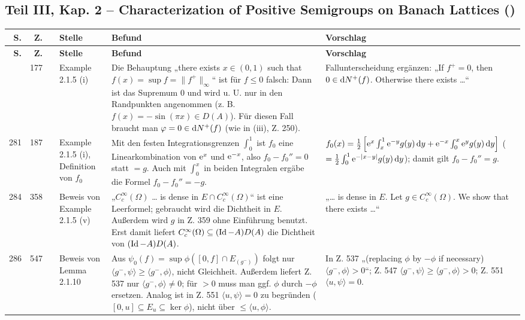 \documentclass[10pt]{article}
\begin{document}
\subsection*{Teil III, Kap. 2 – Characterization of Positive Semigroups on Banach Lattices ()}
\begin{longtable}{@{}rrc>{\RaggedRight\arraybackslash}p{3.0cm}>{\RaggedRight\arraybackslash}p{11.4cm}>{\RaggedRight\arraybackslash}p{7.4cm}@{}}
\toprule
\textbf{S.} & \textbf{Z.} & \textbf{} & \textbf{Stelle} & \textbf{Befund} & \textbf{Vorschlag} \\
\midrule
\endfirsthead
\toprule
\textbf{S.} & \textbf{Z.} & \textbf{} & \textbf{Stelle} & \textbf{Befund} & \textbf{Vorschlag} \\
\midrule
\endhead
\bottomrule
\endlastfoot
281 & 177 & \sichC{} & Example 2.1.5 (i) & Die Behauptung „there exists $x \in (0,1)$ such that $f(x) = \sup f = \|f^{+}\|_{\infty}$“ ist für $f \leq 0$ falsch: Dann ist das Supremum 0 und wird u. U. nur in den Randpunkten angenommen (z. B. $f(x) = -\sin(\pi x) \in D(A)$). Für diesen Fall braucht man $\phi = 0 \in \diff{N^{+}}(f)$ (wie in (iii), Z. 250). & Fallunterscheidung ergänzen: „If $f^{+} = 0$, then $0 \in \mathop{}\!\mathrm{d}{N^{+}}(f)$. Otherwise there exists \dots{}“ \\[2pt]
281 & 187 & \sichA{} & Example 2.1.5 (i), Definition von $f_{0}$ & Mit den festen Integrationsgrenzen $\int_{0}^{1}$ ist $f_{0}$ eine Linearkombination von $\mathrm{e}^{x}$ und $\mathrm{e}^{-x}$, also $f_{0} - f_{0}'' = 0$ statt $= g$. Auch mit $\int_{0}^{x}$ in beiden Integralen ergäbe die Formel $f_{0} - f_{0}'' = -g$. & $f_{0}(x) = \frac{1}{2} \left[\mathrm{e}^{x} \int_{x}^{1} \mathrm{e}^{-y}g(y) \mathop{}\!\mathrm{d}{y} + \mathrm{e}^{-x} \int_{0}^{x} \mathrm{e}^{y}g(y) \mathop{}\!\mathrm{d}{y} \right]$ ($= \frac12\int_0^1 \mathrm{e}^{-\vert x-y\vert}g(y)\mathop{}\!\mathrm{d}{y}$); damit gilt $f_{0} - f_{0}'' = g$. \\[2pt]
284 & 358 & \sichB{} & Beweis von Example 2.1.5 (v) & „$C_{c}^{\infty}(\Omega)$ \dots{} is dense in $E \cap C_{c}^{\infty}(\Omega)$“ ist eine Leerformel; gebraucht wird die Dichtheit in $E$. Außerdem wird $g$ in Z. 359 ohne Einführung benutzt. Erst damit liefert $C_{c}^{\infty}(\Omega) \subseteq (\operatorname{Id} - A)D(A)$ die Dichtheit von $(\operatorname{Id} - A)D(A)$. & „\dots{} is dense in $E$. Let $g \in C_{c}^{\infty}(\Omega)$. We show that there exists \dots{}“ \\[2pt]
286 & 547 & \sichB{} & Beweis von Lemma 2.1.10 & Aus $\psi_{0}(f) = \sup \phi([0,f] \cap E_{(g^{-})})$ folgt nur $\langle g^{-},\psi \rangle \geq \langle g^{-},\phi \rangle$, nicht Gleichheit. Außerdem liefert Z. 537 nur $\langle g^{-},\phi \rangle \neq 0$; für $> 0$ muss man ggf. $\phi$ durch $-\phi$ ersetzen. Analog ist in Z. 551 $\langle u,\psi \rangle = 0$ zu begründen ($[0,u] \subseteq E_{u} \subseteq \ker\phi$), nicht über $\leq \langle u,\phi \rangle$. & In Z. 537 „(replacing $\phi$ by $-\phi$ if necessary) $\langle g^{-},\phi \rangle > 0$“; Z. 547 $\langle g^{-},\psi \rangle \geq \langle g^{-},\phi \rangle > 0$; Z. 551 $\langle u,\psi \rangle = 0$. \\[2pt]

\end{longtable}
\end{document}
